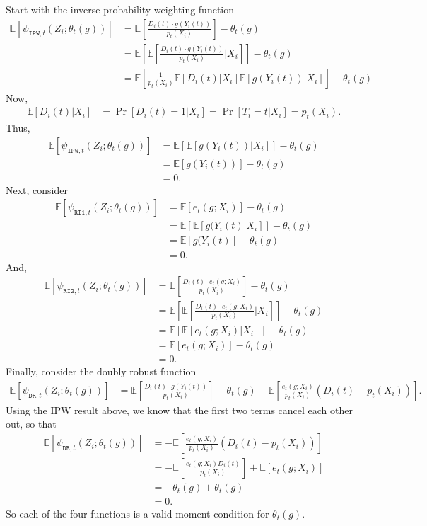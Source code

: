 \documentclass[12pt]{article}
\newcommand{\E}{\mathbb{E}}
\newcommand{\mtx}[1]{\ensuremath{\bm{\mathit{#1}}}}
\begin{document}
Start with the inverse probability weighting function
\begin{align*}
\E[\psi_{\texttt{IPW},t}(\mtx{Z}_i; \theta_t(g))] &=\E\left[\frac{D_i(t)\cdot g(Y_i(t))}{p_t(\mtx{X}_i)}\right] - \theta_t(g)\\
&=\E\left[\E\left[\frac{D_i(t)\cdot g(Y_i(t))}{p_t(\mtx{X}_i)}| \mtx{X}_i\right]\right] - \theta_t(g)\\
&=\E\left[\frac{1}{p_t(\mtx{X}_i)}\E\left[D_i(t)|\mtx{X}_i\right]\E\left[ g(Y_i(t))| \mtx{X}_i\right]\right] - \theta_t(g)
\end{align*}
Now, 
\begin{align*}
\E\left[D_i(t)|\mtx{X}_i\right] & = \Pr[D_i(t)=1|\mtx{X}_i] = \Pr[T_i = t|\mtx{X}_i] = p_t(\mtx{X}_i).
\end{align*}
Thus,
\begin{align*}
\E[\psi_{\texttt{IPW},t}(\mtx{Z}_i; \theta_t(g))] &= \E\left[\E\left[ g(Y_i(t))| \mtx{X}_i\right]\right] - \theta_t(g)\\
&=\E[g(Y_i(t))] - \theta_t(g)\\
&=0.
\end{align*}
Next, consider
\begin{align*}
\E[\psi_{\texttt{RI1},t}(\mtx{Z}_i; \theta_t(g))] &= \E[e_t(g;\mtx{X}_i)] - \theta_t(g)\\
&=\E[\E[g(Y_i(t)|\mtx{X}_i]] - \theta_t(g)\\
&=\E[g(Y_i(t)] -  \theta_t(g)\\
&=0.
\end{align*}
And,
\begin{align*}
\E[\psi_{\texttt{RI2},t}(\mtx{Z}_i; \theta_t(g))] &= \E\left[\frac{D_i(t)\cdot e_t(g;\mtx{X}_i)}{p_t(\mtx{X}_i)}\right]  - \theta_t(g)\\
&=\E\left[\E\left[\frac{D_i(t)\cdot e_t(g;\mtx{X}_i)}{p_t(\mtx{X}_i)}| \mtx{X}_i\right]\right] - \theta_t(g)\\
&=\E\left[\E\left[e_t(g;\mtx{X}_i)| \mtx{X}_i\right]\right] - \theta_t(g)\\
&= \E[e_t(g;\mtx{X}_i)] - \theta_t(g)\\
&=0.
\end{align*}
Finally, consider the doubly robust function
\begin{align*}
\E[\psi_{\texttt{DR},t}(\mtx{Z}_i; \theta_t(g))] &= \E\left[\frac{D_i(t)\cdot g(Y_i(t))}{p_t(\mtx{X}_i)}\right] - \theta_t(g) - \E\left[\frac{e_t(g;\mtx{X}_i)}{p_t(\mtx{X}_i)}(D_i(t)-p_t(\mtx{X}_i))\right].
\end{align*}
Using the IPW result above, we know that the first two terms cancel each other out, so that
\begin{align*}
\E[\psi_{\texttt{DR},t}(\mtx{Z}_i; \theta_t(g))] &=- \E\left[\frac{e_t(g;\mtx{X}_i)}{p_t(\mtx{X}_i)}(D_i(t)-p_t(\mtx{X}_i))\right]\\
&=- \E\left[\frac{e_t(g;\mtx{X}_i)D_i(t)}{p_t(\mtx{X}_i)}\right] + \E[e_t(g;\mtx{X}_i)]\\
&= -\theta_t(g) + \theta_t(g)\\
&=0.
\end{align*}
So each of the four functions is a valid moment condition for $\theta_t(g)$.
\end{document}
